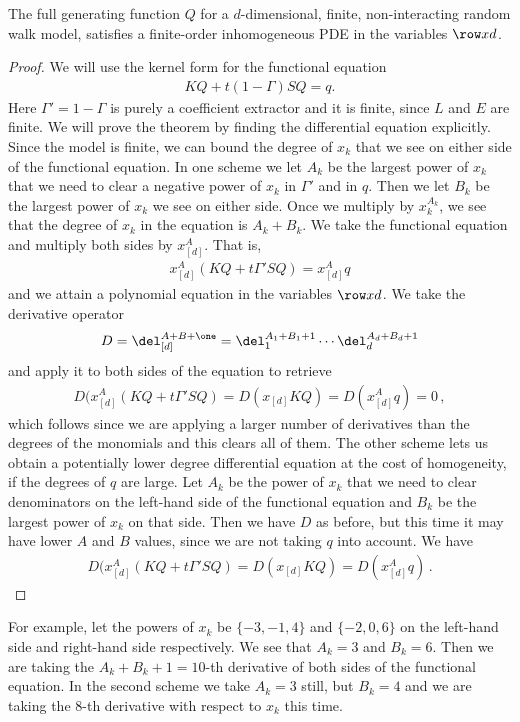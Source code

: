 \begin{theorem} The full generating function $Q$ for a $d$-dimensional, finite, non-interacting random walk model, satisfies a finite-order inhomogeneous PDE in the variables $\row xd$.
\end{theorem}
\begin{proof} We will use the kernel form for the functional equation
\begin{align}
	KQ + t(1- \Gamma)SQ = q.
\end{align}
Here $\Gamma' = 1- \Gamma$ is purely a coefficient extractor and it is finite, since $L$ and $E$ are finite. We will prove the theorem by finding the differential equation explicitly. Since the model is finite, we can bound the degree of $x_k$ that we see on either side of the functional equation. In one scheme we let $A_k$ be the largest power of $x_k$ that we need to clear a negative power of $x_k$ in $\Gamma'$ and in $q$. Then we let $B_k$ be the largest power of $x_k$ we see on either side. Once we multiply by $x_k^{A_k}$, we see that the degree of $x_k$ in the equation is $A_k+B_k$. We take the functional equation and multiply both sides by $x_{[d]}^{A}$. That is,
\begin{align}
	x_{[d]}^{A}(KQ + t\Gamma'SQ) = x_{[d]}^{A}q
\end{align}
and we attain a polynomial equation in the variables $\row xd$. We take the derivative operator
\begin{align}
	D = \del_{[d]}^{A+B+\one} = \del_1^{A_1+B_1+1}\cdots\del_d^{A_d+B_d+1}
\end{align}
and apply it to both sides of the equation to retrieve
\begin{align}
	D(x_{[d]}^{A}(KQ + t\Gamma'SQ)  = D(x_{[d]}KQ) = D(x_{[d]}^{A}q) = 0\,,
\end{align}
which follows since we are applying a larger number of derivatives than the degrees of the monomials and this clears all of them. The other scheme lets us obtain a potentially lower degree differential equation at the cost of homogeneity, if the degrees of $q$ are large. Let $A_k$ be the power of $x_k$ that we need to clear denominators on the left-hand side of the functional equation and $B_k$ be the largest power of $x_k$ on that side. Then we have $D$ as before, but this time it may have lower $A$ and $B$ values, since we are not taking $q$ into account. We have
\begin{align}
	D(x_{[d]}^{A}(KQ + t\Gamma'SQ)  = D(x_{[d]}KQ) = D(x_{[d]}^{A}q)\,.
\end{align}
\end{proof}
\begin{example} For example, let the powers of $x_k$ be $\{-3,-1,4\}$ and $\{-2,0,6\}$ on the left-hand side and right-hand side respectively. We see that $A_k = 3$ and $B_k = 6$. Then we are taking the $A_k + B_k + 1 = 10$-th derivative of both sides of the functional equation. In the second scheme we take $A_k = 3$ still, but $B_k = 4$ and we are taking the 8-th derivative with respect to $x_k$ this time. 
\end{example}

